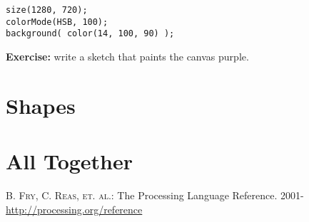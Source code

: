 \documentclass[
]{leaflet}
\begin{document}
\begin{lstlisting}
size(1280, 720);
colorMode(HSB, 100);
background( color(14, 100, 90) );
\end{lstlisting}

\textbf{Exercise:} write a sketch that paints the canvas purple.

\section{Shapes}

\section{All Together}


\begin{thebibliography}{000}
  \textsc{B. Fry, C. Reas, et. al.}: The Processing Language Reference. 2001-\\
  \url{http://processing.org/reference}
\end{thebibliography}

\loggingall
\end{document}
